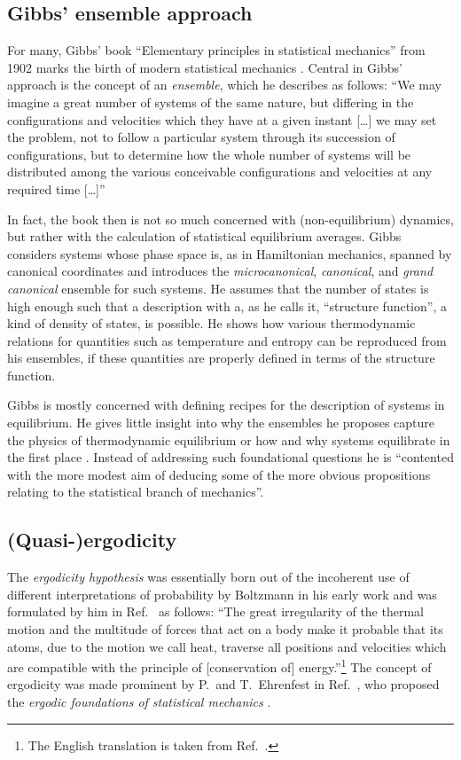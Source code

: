 \documentclass[a4paper,12pt,listof=totoc,index=totoc,bibliography=totoc,headsepline=false,headings=normal,BCOR16.153846mm,DIV12,headinclude,twoside,cleardoublepage=empty,numbers=noenddot,final]{scrreprt}
\theoremstyle{mystyle}
\numberwithin{equation}{section}
\numberwithin{figure}{section}
\numberwithin{lemma}{section}
\numberwithin{theorem}{section}
\numberwithin{corollary}{section}
\numberwithin{definition}{section}
\numberwithin{conjecture}{section}
\numberwithin{observation}{section}
\newcommand{\+}{\mkern2mu}
\DeclareMathOperator{\1}{\mathds{1}}
\begin{document}
\subsection{Gibbs'  ensemble approach}
\label{sec:gibbsensembleapproach}
%
For many, Gibbs' book ``Elementary principles in statistical mechanics'' \cite{Gibbs1902} from 1902 marks the birth of modern statistical mechanics \cite{UffinkFinal}.
Central in Gibbs' approach is the concept of an \emph{ensemble}, which he describes as follows:
``We may imagine a great number of systems of the same nature, but differing in the configurations and velocities which they have at a given instant [\dots] we may set the problem, not to follow a particular system through its succession of configurations, but to determine how the whole number of systems will be distributed among the various conceivable configurations and velocities at any required time [\dots]''

In fact, the book then is not so much concerned with (non-equilibrium) dynamics, but rather with the calculation of statistical equilibrium averages.
Gibbs considers systems whose phase space is, as in Hamiltonian mechanics, spanned by canonical coordinates and introduces the \emph{microcanonical}, \emph{canonical}, and \emph{grand canonical} ensemble for such systems.
He assumes that the number of states is high enough such that a description with a, as he calls it, ``structure function'', a kind of density of states, is possible.
He shows how various thermodynamic relations for quantities such as temperature and entropy can be reproduced from his ensembles, if these quantities are properly defined in terms of the structure function.

Gibbs is mostly concerned with defining recipes for the description of systems in equilibrium.
He gives little insight into why the ensembles he proposes capture the physics of thermodynamic equilibrium or how and why systems equilibrate in the first place \cite{UffinkFinal}.
Instead of addressing such foundational questions he is ``contented with the more modest aim of deducing some of the more obvious propositions relating to the statistical branch of mechanics''\cite{Gibbs1902}.


\subsection{(Quasi-)ergodicity}
\label{sec:ergodicity}
%
The \emph{ergodicity hypothesis} was essentially born out of the incoherent use of different interpretations of probability by Boltzmann in his early work \cite{Boltzmann1868} and was formulated by him in Ref.~\cite{Boltzmann1871} as follows:
``The great irregularity of the thermal motion and the multitude of forces that act on a body make it probable that its atoms, due to the motion we call heat, traverse all positions and velocities which are compatible with the principle of [conservation of] energy.''\footnote{The English translation is taken from Ref.~\cite{UffinkFinal}.}
The concept of ergodicity was made prominent by P.\ and T.\ Ehrenfest in Ref.~\cite{Ehrenfest2002}, who proposed the \emph{ergodic foundations of statistical mechanics} \cite{UffinkFinal}.
\end{document}
